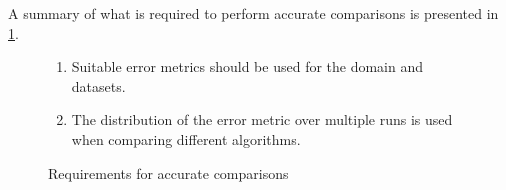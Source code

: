 A summary of what is required to perform accurate comparisons is presented in \ref{fig:accurate_requirements}.

\begin{figure}[h]
  \begin{enumerate}
    \item Suitable error metrics should be used for the domain and datasets.
    \item The distribution of the error metric over multiple runs is used when comparing different algorithms.
  \end{enumerate}
  \caption{Requirements for accurate comparisons}
  \label{fig:accurate_requirements}
\end{figure}





